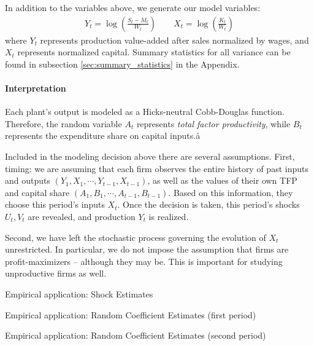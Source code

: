 In addition to the variables above, we generate our model variables:
\begin{align}
  Y_{t} = \log\left( \frac{S_{t} - M_{t}}{W_{t}}\right) \qquad X_{t} = \log \left( \frac{K_{t}}{W_{t}} \right)
\end{align}
\noindent where $Y_{t}$ represents production value-added after sales normalized by wages, and $X_t$ represents normalized capital. Summary statistics for all variance can be found in subsection \ref{sec:summary_statistics} in the Appendix. 

\paragraph{Interpretation} Each plant's output is modeled as a Hicks-neutral Cobb-Douglas function. Therefore, the random variable $A_{t}$ represents \emph{total factor productivity}, while $B_{t}$ represents the expenditure share on capital inputs.å

Included in the modeling decision above there are several assumptions. First, timing: we are assuming that each firm observes the entire history of past inputs and outputs $(Y_{1}, X_{1}, \cdots, Y_{t-1}, X_{t-1})$, as well as the values of their own TFP and capital share $(A_{1}, B_{1}, \cdots, A_{t-1}, B_{t-1})$. Based on this information, they choose this period's inputs $X_{t}$. Once the decision is taken, this period's shocks $U_{t}, V_{t}$ are revealed, and production $Y_{t}$ is realized.

Second, we have left the stochastic process governing the evolution of $X_{t}$ unrestricted. In particular, we do not impose the assumption that firms are profit-maximizers -- although they may be. This is important for studying unproductive firms as well.



\begin{table}[H]
  \singlespacing
  \caption{Empirical application: Shock Estimates}
  
\end{table}

\begin{table}[H]
  \singlespacing
  \caption{Empirical application: Random Coefficient Estimates (first period)}
  
\end{table}

\begin{table}[H]
  \singlespacing
  \caption{Empirical application: Random Coefficient Estimates (second period)}
  
\end{table}




